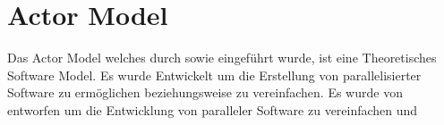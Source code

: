 \chapter{Actor Model}
Das Actor Model welches durch \cite{hewitt1973session} sowie \cite{Agha1985Actors:Systems.} eingeführt wurde, ist eine Theoretisches Software Model. Es wurde Entwickelt um die Erstellung von parallelisierter Software zu ermöglichen beziehungsweise zu vereinfachen. 
Es wurde von \cite{hewitt1973session} entworfen um die Entwicklung von paralleler Software zu vereinfachen und 